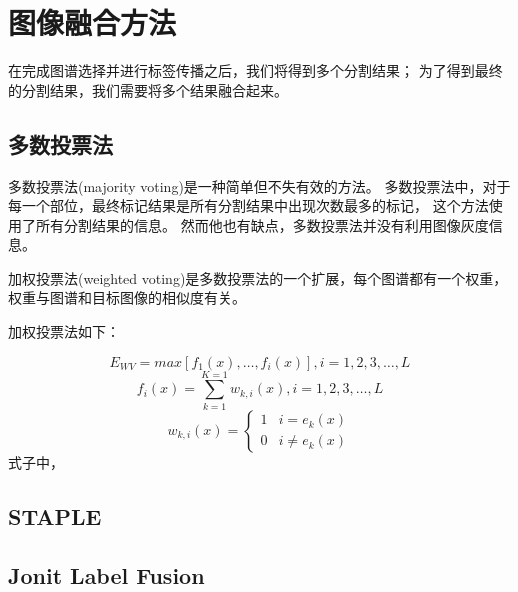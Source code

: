 \section{图像融合方法}
在完成图谱选择并进行标签传播之后，我们将得到多个分割结果；
为了得到最终的分割结果，我们需要将多个结果融合起来。

\subsection{多数投票法}
多数投票法(majority voting)是一种简单但不失有效的方法。
多数投票法中，对于每一个部位，最终标记结果是所有分割结果中出现次数最多的标记，
这个方法使用了所有分割结果的信息。
然而他也有缺点，多数投票法并没有利用图像灰度信息。

加权投票法(weighted voting)是多数投票法的一个扩展，每个图谱都有一个权重，
权重与图谱和目标图像的相似度有关。

加权投票法如下：

\begin{equation}
  E_{WV}=max[f_1(x),\ldots,f_i(x)], i=1,2,3,\ldots,L
\end{equation}
\begin{equation}
  f_i(x)=\sum_{k=1}^{K=1}w_{k,i}(x), i=1,2,3,\ldots,L
\end{equation}
\begin{equation}
  w_{k,i}(x)=
  \begin{cases}
    1 & i=e_k(x)\\
    0 & i\ne e_k(x)
  \end{cases}
\end{equation}
式子中，

\subsection{STAPLE}

\subsection{Jonit Label Fusion}
